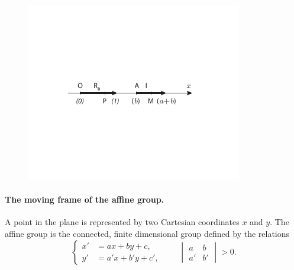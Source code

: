 \begin{figure}[h]
  \centering
\includegraphics[scale=1.8]{cartangrp-f3}  
  \caption{}
  \label{fig:3}
\end{figure}


\paragraph{The moving frame of the affine group.}
\label{sec:65}
A point in the plane is represented by two Cartesian coordinates $x$ and $y$. The affine group is the connected, finite dimensional group defined by the relations
\begin{equation}
  \label{eq:5.4}
  \left\{
    \begin{aligned}
      x'&=ax+by+c,\\
      y'&=a'x+b'y+c',
    \end{aligned}
  \right.
  \qquad
  \begin{vmatrix}
    a&b\\
    a'&b'
  \end{vmatrix}
  >0.
\end{equation}

